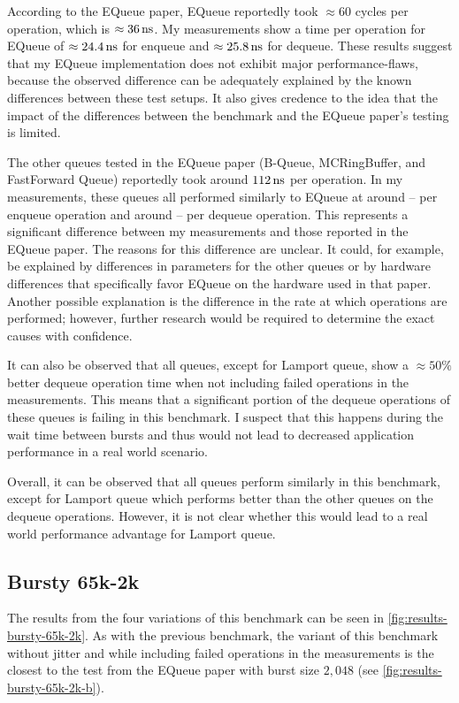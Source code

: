 According to the EQueue paper, EQueue reportedly took $\approx 60$ cycles per operation, which is
$\approx \SI{36}{\nano\second}$.
My measurements show a time per operation for EQueue of $\approx \SI{24.4}{\nano\second}$ for enqueue and
$\approx \SI{25.8}{\nano\second}$ for dequeue.
These results suggest that my EQueue implementation does not exhibit major performance-flaws, because the
observed difference can be adequately explained by the known differences between these test setups.
It also gives credence to the idea that the impact of the differences between the benchmark and the EQueue
paper's testing is limited.

The other queues tested in the EQueue paper (B-Queue, MCRingBuffer, and FastForward Queue) reportedly took
around $\SI{112}{\nano\second}$ per operation.
In my measurements, these queues all performed similarly to EQueue at around -- per enqueue operation
and around -- per dequeue operation.
This represents a significant difference between my measurements and those reported in the EQueue paper.
The reasons for this difference are unclear.
It could, for example, be explained by differences in parameters for the other queues or by hardware
differences that specifically favor EQueue on the hardware used in that paper.
Another possible explanation is the difference in the rate at which operations are performed;
however, further research would be required to determine the exact causes with confidence.

It can also be observed that all queues, except for Lamport queue, show a $\approx 50\%$ better dequeue
operation time when not including failed operations in the measurements.
This means that a significant portion of the dequeue operations of these queues is failing in this benchmark.
I suspect that this happens during the wait time between bursts and thus would not lead to decreased
application performance in a real world scenario.

Overall, it can be observed that all queues perform similarly in this benchmark, except for Lamport queue
which performs better than the other queues on the dequeue operations.
However, it is not clear whether this would lead to a real world performance advantage for Lamport queue.

\subsection{Bursty 65k-2k}

The results from the four variations of this benchmark can be seen in \autoref{fig:results-bursty-65k-2k}.
As with the previous benchmark, the variant of this benchmark without jitter and while including failed
operations in the measurements is the closest to the test from the EQueue paper with burst size $2,048$ (see
\autoref{fig:results-bursty-65k-2k-b}).

